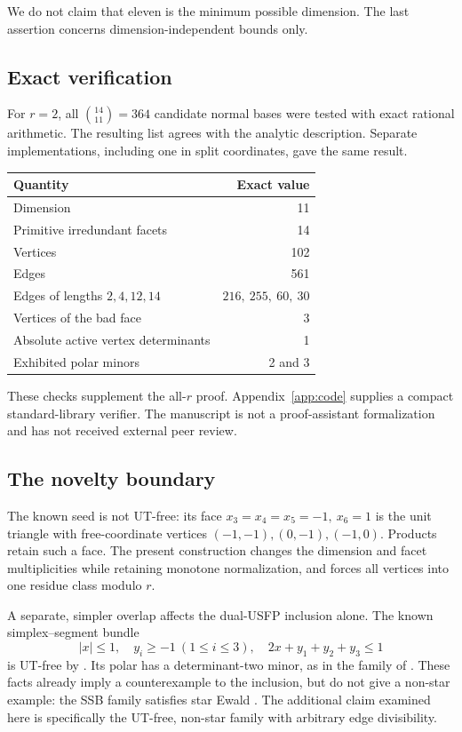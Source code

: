 \documentclass[11pt]{article}
\theoremstyle{remark}\newtheorem{remark}[theorem]{Remark}
\begin{document}
We do not claim that eleven is the minimum possible dimension.
The last assertion concerns dimension-independent bounds only.

\subsection{Exact verification}
For \(r=2\), all \(\binom{14}{11}=364\) candidate normal bases were tested
with exact rational arithmetic. The resulting list agrees with the
analytic description. Separate implementations, including one in
split coordinates, gave the same result.
\begin{center}
\begin{tabular}{@{}lr@{}}
\toprule
Quantity&Exact value\\
\midrule
Dimension&11\\
Primitive irredundant facets&14\\
Vertices&102\\
Edges&561\\
Edges of lengths \(2,4,12,14\)&\(216,\ 255,\ 60,\ 30\)\\
Vertices of the bad face&3\\
Absolute active vertex determinants&1\\
Exhibited polar minors&2 and 3\\
\bottomrule
\end{tabular}
\end{center}
These checks supplement the all-\(r\) proof.
Appendix~\ref{app:code} supplies a compact standard-library verifier.
The manuscript is not a proof-assistant formalization and has not
received external peer review.

\subsection{The novelty boundary}\label{sec:priority}
The known seed is not UT-free: its face
\(x_3=x_4=x_5=-1,\ x_6=1\) is the unit triangle with free-coordinate
vertices \((-1,-1),(0,-1),(-1,0)\).
Products retain such a face.
The present construction changes the dimension and facet
multiplicities while retaining monotone normalization, and forces
all vertices into one residue class modulo \(r\).

A separate, simpler overlap affects the dual-USFP inclusion alone.
The known simplex--segment bundle
\[
 |x|\le1,\quad y_i\ge-1\ (1\le i\le3),\quad
             2x+y_1+y_2+y_3\le1
\]
is UT-free by \cite[Proposition~5.14]{CPS26}.
Its polar has a determinant-two minor, as in the family of
\cite[Example~7.1]{Tu26}. These facts already imply a counterexample
to the inclusion, but do not give a non-star example:
the SSB family satisfies star Ewald \cite[Proposition~5.16]{CPS26}.
The additional claim examined here is specifically the UT-free,
non-star family with arbitrary edge divisibility.
\end{document}
